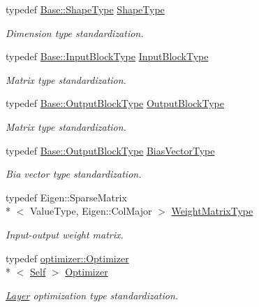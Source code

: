 \begin{DoxyCompactItemize}
typedef \hyperlink{classffnn_1_1layer_1_1_hidden_a7ed1a797fcb7bfb43d66c0eb24967882}{Base\-::\-Shape\-Type} \hyperlink{classffnn_1_1layer_1_1_sparsely_connected_aafb3514023fb9b1eaa11e4c4dbff4c99}{Shape\-Type}
\begin{DoxyCompactList}\small\item\em Dimension type standardization. \end{DoxyCompactList}\item 
typedef \hyperlink{classffnn_1_1layer_1_1_hidden_a01b9cc4df01a7b26423dcd3a0af17b1c}{Base\-::\-Input\-Block\-Type} \hyperlink{classffnn_1_1layer_1_1_sparsely_connected_ad90fd9b4c687e4dc515cf8ca2796043c}{Input\-Block\-Type}
\begin{DoxyCompactList}\small\item\em Matrix type standardization. \end{DoxyCompactList}\item 
typedef \hyperlink{classffnn_1_1layer_1_1_hidden_abb03ddc71360cc7ebdab03cd4d1553ee}{Base\-::\-Output\-Block\-Type} \hyperlink{classffnn_1_1layer_1_1_sparsely_connected_aacf4fb49a3f57aba90e55d8d3c63cf45}{Output\-Block\-Type}
\begin{DoxyCompactList}\small\item\em Matrix type standardization. \end{DoxyCompactList}\item 
typedef \hyperlink{classffnn_1_1layer_1_1_hidden_abb03ddc71360cc7ebdab03cd4d1553ee}{Base\-::\-Output\-Block\-Type} \hyperlink{classffnn_1_1layer_1_1_sparsely_connected_ad2d566cbb6c54c8723d79737075b4a00}{Bias\-Vector\-Type}
\begin{DoxyCompactList}\small\item\em Bia vector type standardization. \end{DoxyCompactList}\item 
typedef Eigen\-::\-Sparse\-Matrix\\*
$<$ Value\-Type, Eigen\-::\-Col\-Major $>$ \hyperlink{classffnn_1_1layer_1_1_sparsely_connected_acafafa368b81042965eed9607cad2dbd}{Weight\-Matrix\-Type}
\begin{DoxyCompactList}\small\item\em Input-\/output weight matrix. \end{DoxyCompactList}\item 
typedef \hyperlink{classffnn_1_1optimizer_1_1_optimizer}{optimizer\-::\-Optimizer}\\*
$<$ \hyperlink{classffnn_1_1layer_1_1_sparsely_connected_ad27c96a5f26e2f44fb25bebd9a838666}{Self} $>$ \hyperlink{classffnn_1_1layer_1_1_sparsely_connected_a87466efb64ebf340fa07194c94846ace}{Optimizer}
\begin{DoxyCompactList}\small\item\em \hyperlink{classffnn_1_1layer_1_1_layer}{Layer} optimization type standardization. \end{DoxyCompactList}\end{DoxyCompactItemize}
